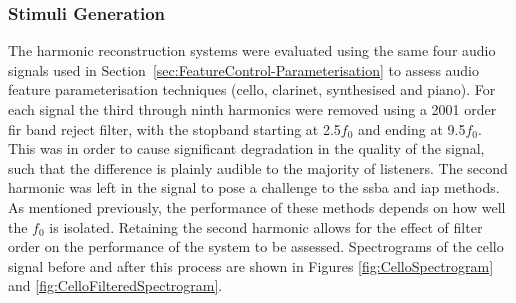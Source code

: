 		\subsubsection*{Stimuli Generation}
			The harmonic reconstruction systems were evaluated using the same four audio signals used in
			Section~\ref{sec:FeatureControl-Parameterisation} to assess audio feature parameterisation
			techniques (cello, clarinet, synthesised and piano). For each signal the third through ninth
			harmonics were removed using a 2001 order \acrshort{fir} band reject filter, with the
			stopband starting at 2.5$f_{0}$ and ending at 9.5$f_{0}$. This was in order to cause significant
			degradation in the quality of the signal, such that the difference is plainly audible to the
			majority of listeners. The second harmonic was left in the signal to pose a challenge to the
			\acrshort{ssba} and \acrshort{iap} methods. As mentioned previously, the performance of these
			methods depends on how well the $f_{0}$ is isolated.  Retaining the second harmonic allows for the
			effect of filter order on the performance of the system to be assessed. Spectrograms of the cello
			signal before and after this process are shown in Figures \ref{fig:CelloSpectrogram} and
			\ref{fig:CelloFilteredSpectrogram}. 

